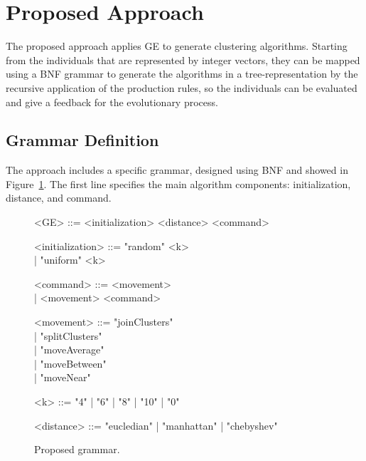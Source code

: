 \documentclass[conference]{IEEEtran}
\begin{document}
	
	\section{Proposed Approach} \label{sec:methodology}
	
	
	The proposed approach applies GE to generate clustering algorithms. Starting from the individuals that are represented by integer vectors, they can be mapped using a BNF grammar to generate the algorithms in a tree-representation by the recursive application of the production rules, so the individuals can be evaluated and give a feedback for the evolutionary process.
	
	
	\subsection{Grammar Definition}
	
	The approach includes a specific grammar, designed  using  BNF and showed in Figure~\ref{gr:proposed_grammar}. The first line specifies the main algorithm components: initialization, distance, and command. 
	
	
	\begin{figure}[!htb]
		\begin{center}
			\begin{grammar}
				<GE> ::= <initialization> <distance> <command>
				
				<initialization> ::= "random" <k> \\| "uniform" <k>
				
				<command> ::= <movement> \\| <movement> <command>
				
				<movement> ::= "joinClusters" \\| "splitClusters" \\| "moveAverage" \\| "moveBetween" \\| "moveNear"
				
				<k> ::= "4" | "6" | "8" | "10" | "0"
				
				<distance> ::= "eucledian" | "manhattan" | "chebyshev"
			\end{grammar}
		\end{center}
		\caption{Proposed grammar.}
		\label{gr:proposed_grammar}
	\end{figure}
	
\end{document}
